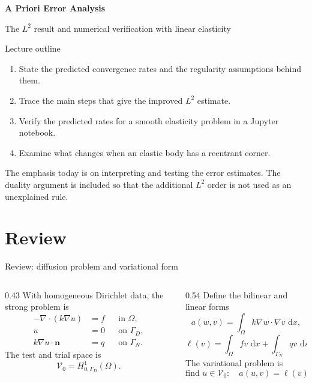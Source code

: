 \documentclass[11pt,aspectratio=169]{beamer}
\newcommand{\dd}{\,\mathrm{d}}
\newcommand{\Om}{\Omega}
\newcommand{\GamD}{\Gamma_D}
\newcommand{\GamN}{\Gamma_N}
\newcommand{\Vzero}{\mathcal V_0}
\newcommand{\divg}{\nabla\!\cdot}
\begin{document}
\begin{frame}[plain]
  \centering\vfill
  {\LARGE\bfseries A Priori Error Analysis\par}
  \vspace{0.45cm}
  {\large The $L^2$ result and numerical verification with linear elasticity\par}
  \vfill
\end{frame}

\begin{frame}{Lecture outline}
\begin{enumerate}
  \item State the predicted convergence rates and the regularity assumptions
  behind them.
  \item Trace the main steps that give the improved $L^2$ estimate.
  \item Verify the predicted rates for a smooth elasticity problem in a
  Jupyter notebook.
  \item Examine what changes when an elastic body has a reentrant corner.
\end{enumerate}
\vspace{0.35cm}

The emphasis today is on interpreting and testing the error estimates. The
duality argument is included so that the additional $L^2$ order is not used as
an unexplained rule.
\end{frame}

\section{Review}

\begin{frame}{Review: diffusion problem and variational form}
\begin{columns}[T,onlytextwidth]
  \begin{column}{0.43\textwidth}
    With homogeneous Dirichlet data, the strong problem is
    \[
      \begin{aligned}
      -\divg(k\nabla u)&=f &&\text{in }\Om,\\
      u&=0 &&\text{on }\GamD,\\
      k\nabla u\cdot\bm n&=q &&\text{on }\GamN.
      \end{aligned}
    \]
    The test and trial space is
    \[
      \Vzero=H^1_{0,\GamD}(\Om).
    \]
  \end{column}
  \begin{column}{0.54\textwidth}
    Define the bilinear and linear forms
    \[
      a(w,v)=\int_\Om k\nabla w\cdot\nabla v\,\dd x,
    \]
    \[
      \ell(v)=\int_\Om fv\,\dd x
      +\int_{\GamN}qv\,\dd s.
    \]
    The variational problem is
    \[
      \boxed{\text{find }u\in\Vzero:
      \quad a(u,v)=\ell(v)
      \quad\forall v\in\Vzero.}
    \]
  \end{column}
\end{columns}
\end{frame}
\end{document}
